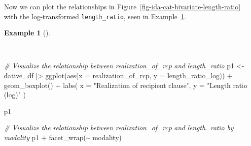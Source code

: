 \documentclass[
  letterpaper,
  DIV=11,
  numbers=noendperiod]{scrreprt}
\newenvironment{Shaded}{\begin{snugshade}}{\end{snugshade}}
\newcommand{\AttributeTok}[1]{\textcolor[rgb]{0.00,0.00,0.00}{#1}}
\newcommand{\CommentTok}[1]{\textcolor[rgb]{0.00,0.00,0.00}{\textit{#1}}}
\newcommand{\FunctionTok}[1]{\textcolor[rgb]{0.00,0.00,0.00}{#1}}
\newcommand{\NormalTok}[1]{\textcolor[rgb]{0.00,0.00,0.00}{#1}}
\newcommand{\OtherTok}[1]{\textcolor[rgb]{0.00,0.00,0.00}{#1}}
\newcommand{\SpecialCharTok}[1]{\textcolor[rgb]{0.00,0.00,0.00}{#1}}
\newcommand{\StringTok}[1]{\textcolor[rgb]{0.00,0.00,0.00}{#1}}
\theoremstyle{definition}
\newtheorem{example}{Example}[chapter]
\theoremstyle{remark}
\begin{document}
Now we can plot the relationships in
Figure~\ref{fig-ida-cat-bivariate-length-ratio} with the log-transformed
\texttt{length\_ratio}, seen in
Example~\ref{exm-ida-cat-bivariate-vis-length-ratio-log}.

\begin{example}[]\protect\hypertarget{exm-ida-cat-bivariate-vis-length-ratio-log}{}\label{exm-ida-cat-bivariate-vis-length-ratio-log}

~

\begin{Shaded}
\begin{Highlighting}[]
\CommentTok{\# Visualize the relationship between \textasciigrave{}realization\_of\_rcp\textasciigrave{} and \textasciigrave{}length\_ratio\textasciigrave{}}
\NormalTok{p1 }\OtherTok{\textless{}{-}}
\NormalTok{  dative\_df }\SpecialCharTok{|\textgreater{}}
  \FunctionTok{ggplot}\NormalTok{(}\FunctionTok{aes}\NormalTok{(}\AttributeTok{x =}\NormalTok{ realization\_of\_rcp, }\AttributeTok{y =}\NormalTok{ length\_ratio\_log)) }\SpecialCharTok{+}
  \FunctionTok{geom\_boxplot}\NormalTok{() }\SpecialCharTok{+}
  \FunctionTok{labs}\NormalTok{(}
    \AttributeTok{x =} \StringTok{"Realization of recipient clause"}\NormalTok{,}
    \AttributeTok{y =} \StringTok{"Length ratio (log)"}
\NormalTok{  )}

\NormalTok{p1}

\CommentTok{\# Visualize the relationship between \textasciigrave{}realization\_of\_rcp\textasciigrave{} and \textasciigrave{}length\_ratio\textasciigrave{} by \textasciigrave{}modality\textasciigrave{}}
\NormalTok{p1 }\SpecialCharTok{+}
  \FunctionTok{facet\_wrap}\NormalTok{(}\SpecialCharTok{\textasciitilde{}}\NormalTok{ modality)}
\end{Highlighting}
\end{Shaded}

\begin{figure}[H]

\begin{minipage}{0.50\linewidth}



\end{minipage}%
%
\begin{minipage}{0.50\linewidth}


\end{minipage}
\end{figure}
\end{example}
\end{document}
